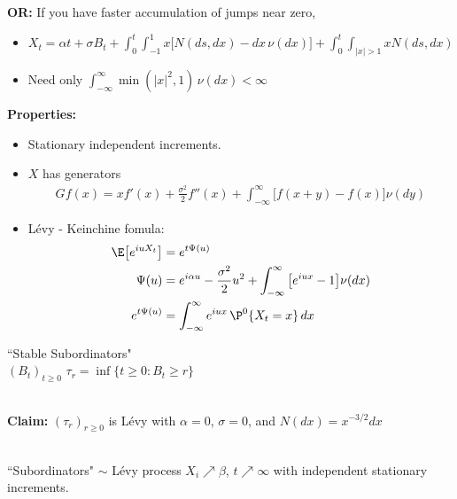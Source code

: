 \documentclass[12pt]{article}
\begin{document}
\noindent \textbf{OR:} If you have faster accumulation of jumps near zero,
\begin{itemize}
\item[$(**)$] $\displaystyle X_t = \alpha t + \sigma B_t + 
	\int_0^t \int_{-1}^1 x \big[ N(ds,dx) - dx \,\nu(dx) \big] +
	\int_0^t \int_{|x| > 1} x N(ds,dx)$
\item[\ ] Need only $\displaystyle \int_{-\infty}^\infty \min(|x|^2, 1)\, \nu(dx) < \infty$ \\
\end{itemize}

\pagebreak
\noindent \textbf{Properties:}
\begin{itemize}
\item[(1)] Stationary independent increments.
\item[(2)] $X$ has generators
	$$\begin{aligned}
	Gf(x) = xf'(x) + \frac{\sigma^2}{2} f''(x) + \int_{-\infty}^\infty \big[f(x+y) - f(x) \big] \nu(dy)
	\end{aligned}$$
\item[(3)] L\'evy - Keinchine fomula:
$$\begin{aligned}
\E\big[ e^{i u X_t} \big] &= e^{t \Psi(u)} \\
\Psi(u) &= e^{i \alpha u} - \frac{\sigma^2}{2}u^2 + \int_{-\infty}^\infty \big[ e^{i u x} - 1 \big] \nu(dx) \\
e^{t\Psi(u)} &= \int_{-\infty}^\infty e^{i u x}\, \P^0 \{X_t = x\} \,dx
\end{aligned}$$
\end{itemize}

\begin{exmp} ``Stable Subordinators" \\

$(B_t)_{t \geq 0}$ \qquad \qquad $\tau_r = \inf\{t \geq 0 : B_t \geq r \}$ \\ \\


\noindent \textbf{Claim:} $(\tau_r)_{r \geq 0}$ is L\'evy with $\alpha = 0$, $\sigma = 0$, and $N(dx) = x^{-3/2}dx$

 \\

``Subordinators" $\sim$ L\'evy process $X_i \nearrow \beta$, $t \nearrow \infty$ with
independent stationary increments. \\
\end{exmp}
\end{document}
